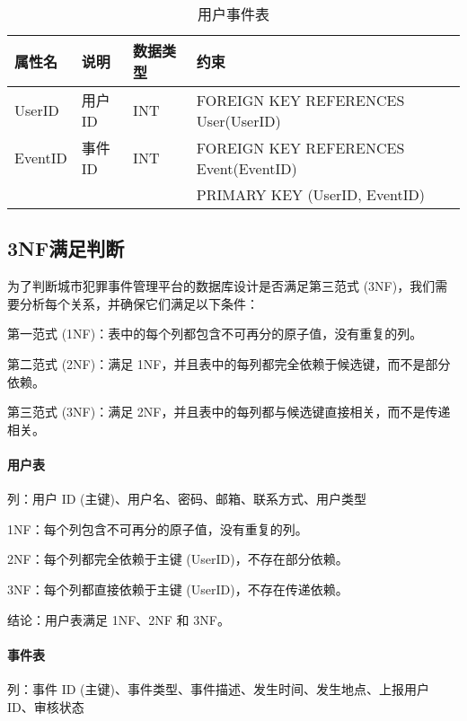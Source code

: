 \begin{table}[htbp]
    \caption{用户事件表}
    \label{tab:rela-user-event}
    \centering
    \begin{tabular}{@{}llll@{}} \toprule
        \textbf{属性名} & \textbf{说明} & \textbf{数据类型} & \textbf{约束} \\ \midrule
        UserID & 用户ID & INT & FOREIGN KEY REFERENCES User(UserID) \\
        EventID & 事件ID & INT & FOREIGN KEY REFERENCES Event(EventID) \\
         & & & PRIMARY KEY (UserID, EventID) \\ \bottomrule
    \end{tabular}
\end{table}

\FloatBarrier

\subsection{3NF满足判断}

为了判断城市犯罪事件管理平台的数据库设计是否满足第三范式 (3NF)，我们需要分析每个关系，并确保它们满足以下条件：

第一范式 (1NF)：表中的每个列都包含不可再分的原子值，没有重复的列。

第二范式 (2NF)：满足 1NF，并且表中的每列都完全依赖于候选键，而不是部分依赖。

第三范式 (3NF)：满足 2NF，并且表中的每列都与候选键直接相关，而不是传递相关。

\paragraph{用户表}

列：用户 ID (主键)、用户名、密码、邮箱、联系方式、用户类型

1NF：每个列包含不可再分的原子值，没有重复的列。

2NF：每个列都完全依赖于主键 (UserID)，不存在部分依赖。

3NF：每个列都直接依赖于主键 (UserID)，不存在传递依赖。

结论：用户表满足 1NF、2NF 和 3NF。

\paragraph{事件表}

列：事件 ID (主键)、事件类型、事件描述、发生时间、发生地点、上报用户 ID、审核状态


